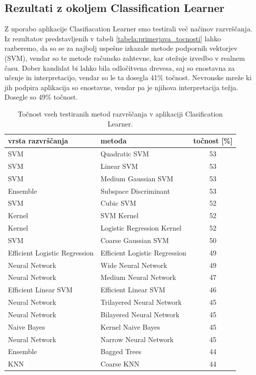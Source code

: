 \subsection{Rezultati z okoljem Classification Learner}
Z uporabo aplikacije Clasifiacation Learner smo testirali več načinov razvrščanja. Iz rezultatov predstavljenih v tabeli \ref{tabela:primerjava_tocnosti} lahko razberemo, da so se za najbolj uspešne izkazale metode podpornih vektorjev (SVM), vendar so te metode računsko zahtevne, kar otežuje izvedbo v realnem času. Dober kandidat bi lahko bila odločitvena drevesa, saj so enostavna za učenje in interpretacijo, vendar so le ta dosegla 41\% točnost. Nevronske mreže ki jih podpira aplikacija so enostavne, vendar pa je njihova interpretacija težja.  Dosegle so 49\% točnost.
\begin{table}
\caption{Točnost vseh testiranih metod razvrščanja v aplikaciji Clasification Learner.}
\vspace{3mm}
\centering
\begin{tabular}{|l|l|c|}
\hline
vrsta razvrščanja & metoda & točnost [\%] \\
\hline SVM&Quadratic SVM&53\\
\hline SVM&Linear SVM&53\\
\hline SVM&Medium Gaussian SVM&53\\
\hline Ensemble&Subspace Discriminant&53\\
\hline SVM&Cubic SVM&52\\
\hline Kernel&SVM Kernel&52\\
\hline Kernel&Logistic Regression Kernel&52\\
\hline SVM&Coarse Gaussian SVM&50\\
\hline Efficient Logistic Regression&Efficient Logistic Regression&49\\
\hline Neural Network&Wide Neural Network&49\\
\hline Neural Network&Medium Neural Network&47\\
\hline Efficient Linear SVM&Efficient Linear SVM&46\\
\hline Neural Network&Trilayered Neural Network&45\\
\hline Neural Network&Bilayered Neural Network&45\\
\hline Naive Bayes&Kernel Naive Bayes&45\\
\hline Neural Network&Narrow Neural Network&45\\
\hline Ensemble&Bagged Trees&44\\
\hline KNN&Coarse KNN&44\\

\end{tabular}
\end{table}
